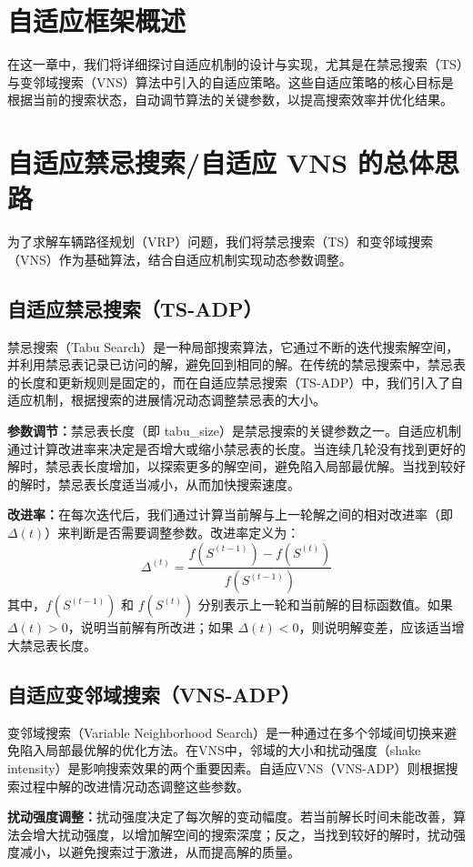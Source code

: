 \documentclass[12pt,a4paper,twoside]{ctexbook}
\begin{document}
\section{自适应框架概述}
在这一章中，我们将详细探讨自适应机制的设计与实现，尤其是在禁忌搜索（TS）与变邻域搜索（VNS）算法中引入的自适应策略。这些自适应策略的核心目标是根据当前的搜索状态，自动调节算法的关键参数，以提高搜索效率并优化结果。

\section{自适应禁忌搜索/自适应 VNS 的总体思路}
为了求解车辆路径规划（VRP）问题，我们将禁忌搜索（TS）和变邻域搜索（VNS）作为基础算法，结合自适应机制实现动态参数调整。

\subsection{自适应禁忌搜索（TS-ADP）}
禁忌搜索（Tabu Search）是一种局部搜索算法，它通过不断的迭代搜索解空间，并利用禁忌表记录已访问的解，避免回到相同的解。在传统的禁忌搜索中，禁忌表的长度和更新规则是固定的，而在自适应禁忌搜索（TS-ADP）中，我们引入了自适应机制，根据搜索的进展情况动态调整禁忌表的大小。

\textbf{参数调节：}禁忌表长度（即 tabu\_size）是禁忌搜索的关键参数之一。自适应机制通过计算改进率来决定是否增大或缩小禁忌表的长度。当连续几轮没有找到更好的解时，禁忌表长度增加，以探索更多的解空间，避免陷入局部最优解。当找到较好的解时，禁忌表长度适当减小，从而加快搜索速度。

\textbf{改进率：}在每次迭代后，我们通过计算当前解与上一轮解之间的相对改进率（即 $\Delta(t)$）来判断是否需要调整参数。改进率定义为：
\[
\Delta^{(t)} = \frac{f(S^{(t-1)}) - f(S^{(t)})}{f(S^{(t-1)})}
\]
其中，$f(S^{(t-1)})$ 和 $f(S^{(t)})$ 分别表示上一轮和当前解的目标函数值。如果 $\Delta(t) > 0$，说明当前解有所改进；如果 $\Delta(t) < 0$，则说明解变差，应该适当增大禁忌表长度。

\subsection{自适应变邻域搜索（VNS-ADP）}
变邻域搜索（Variable Neighborhood Search）是一种通过在多个邻域间切换来避免陷入局部最优解的优化方法。在VNS中，邻域的大小和扰动强度（shake intensity）是影响搜索效果的两个重要因素。自适应VNS（VNS-ADP）则根据搜索过程中解的改进情况动态调整这些参数。

\textbf{扰动强度调整：}扰动强度决定了每次解的变动幅度。若当前解长时间未能改善，算法会增大扰动强度，以增加解空间的搜索深度；反之，当找到较好的解时，扰动强度减小，以避免搜索过于激进，从而提高解的质量。
\end{document}
